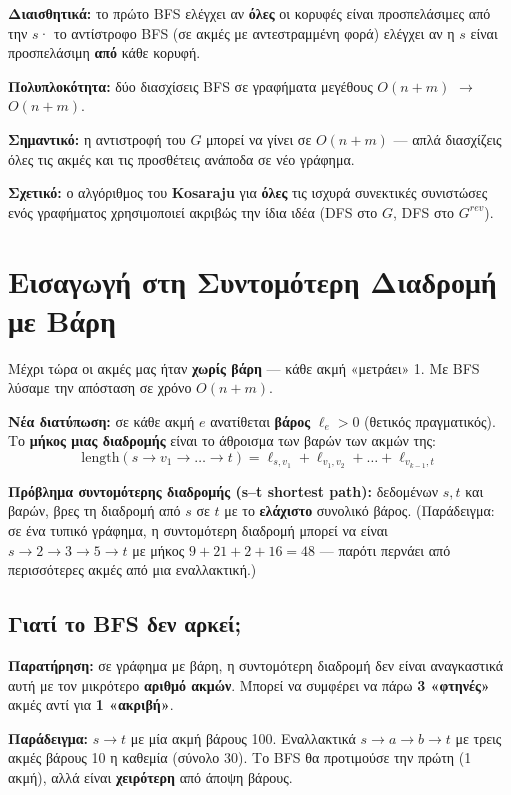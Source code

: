 \documentclass[11pt,a4paper]{article}
\begin{document}
\textbf{Διαισθητικά:} το πρώτο BFS ελέγχει αν \textbf{όλες} οι κορυφές είναι
προσπελάσιμες από την $s$· το αντίστροφο BFS (σε ακμές με αντεστραμμένη φορά)
ελέγχει αν η $s$ είναι προσπελάσιμη \textbf{από} κάθε κορυφή.

\textbf{Πολυπλοκότητα:} δύο διασχίσεις BFS σε γραφήματα μεγέθους $O(n + m)$ $\to$
\textbf{$O(n + m)$}.

\begin{intuition}
\textbf{Σημαντικό:} η αντιστροφή του $G$ μπορεί να γίνει σε $O(n + m)$ --- απλά
διασχίζεις όλες τις ακμές και τις προσθέτεις ανάποδα σε νέο γράφημα.

\textbf{Σχετικό:} ο αλγόριθμος του \textbf{Kosaraju} για \textbf{όλες} τις
ισχυρά συνεκτικές συνιστώσες ενός γραφήματος χρησιμοποιεί ακριβώς την ίδια ιδέα
(DFS στο $G$, DFS στο $G^{rev}$).
\end{intuition}

\section{Εισαγωγή στη Συντομότερη Διαδρομή με Βάρη}

Μέχρι τώρα οι ακμές μας ήταν \textbf{χωρίς βάρη} --- κάθε ακμή «μετράει» 1. Με
BFS λύσαμε την απόσταση σε χρόνο $O(n + m)$.

\textbf{Νέα διατύπωση:} σε κάθε ακμή $e$ ανατίθεται \textbf{βάρος}
$\ell_e > 0$ (θετικός πραγματικός). Το \textbf{μήκος μιας διαδρομής} είναι το
άθροισμα των βαρών των ακμών της:
\[
\text{length}(s \to v_1 \to \dots \to t) = \ell_{s,v_1} + \ell_{v_1,v_2} + \dots
+ \ell_{v_{k-1}, t}
\]

\textbf{Πρόβλημα συντομότερης διαδρομής (s--t shortest path):} δεδομένων $s, t$
και βαρών, βρες τη διαδρομή από $s$ σε $t$ με το \textbf{ελάχιστο} συνολικό
βάρος. (Παράδειγμα: σε ένα τυπικό γράφημα, η συντομότερη διαδρομή μπορεί να είναι
$s \to 2 \to 3 \to 5 \to t$ με μήκος $9 + 21 + 2 + 16 = 48$ --- παρότι περνάει
από περισσότερες ακμές από μια εναλλακτική.)

\subsection{Γιατί το BFS δεν αρκεί;}

\textbf{Παρατήρηση:} σε γράφημα με βάρη, η συντομότερη διαδρομή δεν είναι
αναγκαστικά αυτή με τον μικρότερο \textbf{αριθμό ακμών}. Μπορεί να συμφέρει να
πάρω \textbf{3 «φτηνές»} ακμές αντί για \textbf{1 «ακριβή»}.

\textbf{Παράδειγμα:} $s \to t$ με μία ακμή βάρους 100. Εναλλακτικά
$s \to a \to b \to t$ με τρεις ακμές βάρους 10 η καθεμία (σύνολο 30). Το BFS θα
προτιμούσε την πρώτη (1 ακμή), αλλά είναι \textbf{χειρότερη} από άποψη βάρους.
\end{document}
